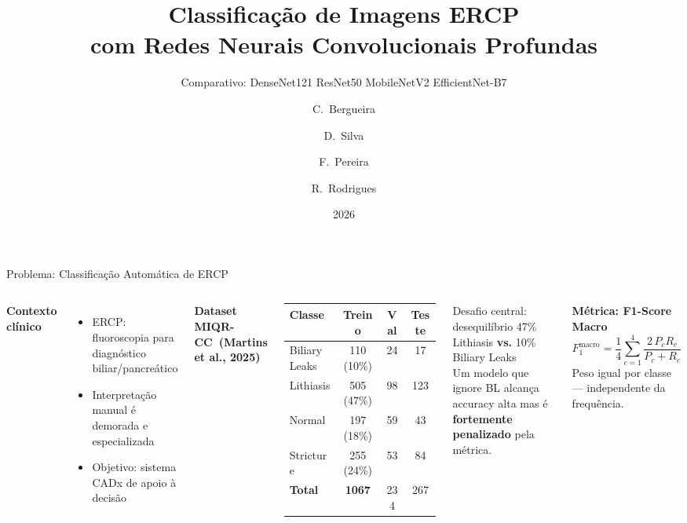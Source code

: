 \documentclass[aspectratio=169]{beamer}
\title[Classificação ERCP com CNNs]{%
  Classificação de Imagens ERCP\\
  com Redes Neurais Convolucionais Profundas}
\subtitle{Comparativo: DenseNet121 \textbullet{} ResNet50 \textbullet{}
          MobileNetV2 \textbullet{} EfficientNet-B7}
\author[Grupo 8: Bergueira, Silva, Pereira, Rodrigues]{%
  C.\ Bergueira \and D.\ Silva \and F.\ Pereira \and R.\ Rodrigues}
\institute[UMinho]{%
  Universidade do Minho --- Grupo 8\\[4pt]
  \small Aprendizagem Profunda - Módulo 2 - 2025/2026}
\date{2026}
\begin{document}

\begin{frame}
  \titlepage
\end{frame}

\begin{frame}{Problema: Classificação Automática de ERCP}
  \begin{columns}[T]
      \textbf{Contexto clínico}
      \begin{itemize}
        \item ERCP: fluoroscopia para diagnóstico biliar/pancreático
        \item Interpretação manual é demorada e especializada
        \item Objetivo: sistema CADx de apoio à decisão
      \end{itemize}
      \medskip
      \textbf{Dataset MIQR-CC~(Martins et al., 2025)}
      {\small
      \begin{tabular}{lccc}
        \toprule
        Classe & Treino & Val & Teste \\
        \midrule
        \alert{Biliary Leaks} & 110 (10\%) & 24 & 17 \\
        Lithiasis          & 505 (47\%) & 98 & 123 \\
        Normal             & 197 (18\%) & 59 & 43 \\
        Stricture          & 255 (24\%) & 53 & 84 \\
        \midrule
        \textbf{Total}     & \textbf{1067} & 234 & 267 \\
        \bottomrule
      \end{tabular}
      }
      \begin{alertblock}{Desafio central: desequilíbrio}
        47\% Lithiasis \textbf{vs.} 10\% Biliary Leaks\\[4pt]
        Um modelo que ignore BL alcança accuracy alta
        mas é \textbf{fortemente penalizado} pela métrica.
      \end{alertblock}
      \medskip
      \textbf{Métrica: F1-Score Macro}
      \[
        F_1^{\text{macro}} = \frac{1}{4}\sum_{c=1}^{4}
        \frac{2\,P_c R_c}{P_c + R_c}
      \]
      \small Peso igual por classe --- independente da frequência.
  \end{columns}
\end{frame}
\end{document}
